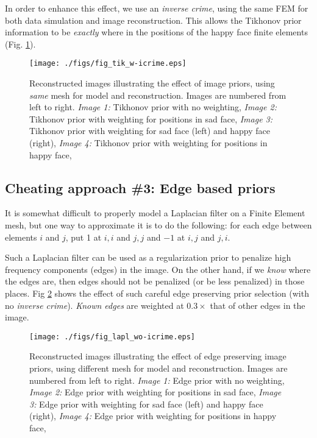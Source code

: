 \documentclass[12pt]{iopart}
\begin{document}
In order to enhance this effect, we use an {\em inverse crime},
using the same FEM for both data simulation and image reconstruction.
This allows the Tikhonov prior information to be {\em exactly} where
in the positions of the happy face finite elements
(Fig. \ref{fig:tikprior_icrime}).

%
%
\begin{figure}[th]
\begin{flushright}
\texttt{[image: ./figs/fig\_tik\_w-icrime.eps]}
\caption{\small 
Reconstructed images illustrating the effect of image priors,
using {\em same} mesh for model and reconstruction.
Images are numbered from left to right.
{\em Image 1:} Tikhonov prior with no weighting,
{\em Image 2:} Tikhonov prior with weighting for positions in sad face,
{\em Image 3:} Tikhonov prior with weighting for sad face (left) and
happy face (right),
{\em Image 4:} Tikhonov prior with weighting for positions in happy face,
 }
 \label{fig:tikprior_icrime}
\end{flushright}
\end{figure}


\subsection{ Cheating approach \#3:
             Edge based priors}

It is somewhat difficult to properly model a Laplacian filter
on a Finite Element mesh, but one way to approximate it is to
do the following: for each edge between elements $i$
and $j$, put 1 at $i,i$ and $j,j$
and $-1$ at $i,j$ and $j,i$.

Such a Laplacian filter can be used as a regularization prior
to penalize high frequency components (edges) in the image.
On the other hand, if we {\em know} where the edges are,
then edges should not be penalized (or be less penalized) in
those places. Fig \ref{fig:laplprior}
shows the effect of such careful
edge preserving prior selection (with no {\em inverse crime}).
{\em Known edges} are weighted at $0.3\times$ that of other
edges in the image.

%
%
\begin{figure}[th]
\begin{flushright}
\texttt{[image: ./figs/fig\_lapl\_wo-icrime.eps]}
\caption{\small 
Reconstructed images illustrating the effect of edge
preserving image priors,
using different mesh for model and reconstruction.
Images are numbered from left to right.
{\em Image 1:} Edge prior with no weighting,
{\em Image 2:} Edge prior with weighting for positions in sad face,
{\em Image 3:} Edge prior with weighting for sad face (left) and
happy face (right),
{\em Image 4:} Edge prior with weighting for positions in happy face,
 }
 \label{fig:laplprior}
\end{flushright}
\end{figure}
\end{document}
